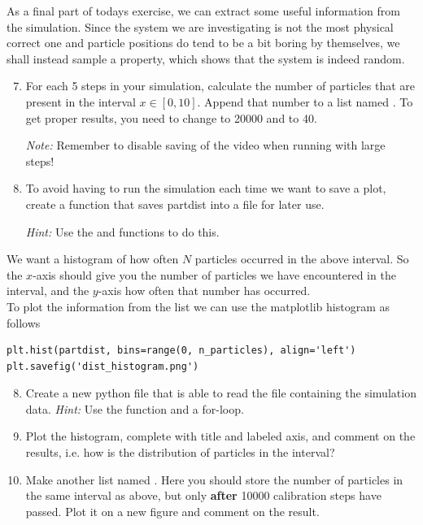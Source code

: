 \documentclass{article}
\begin{document}
As a final part of todays exercise, we can extract some useful information from the simulation.
Since the system we are investigating is not the most physical correct one and particle positions do tend to be a bit boring by themselves, we shall instead sample a property, which shows that the system is indeed random.

\begin{enumerate}
  \setcounter{enumi}{6}
  \item For each 5 steps in your simulation, calculate the number of particles
    that are present in the interval $x \in [0, 10]$.
    Append that number to a list named .
    To get proper results, you need to change  to 20000 and  to 40.

    {\em Note:} Remember to disable saving of the video when running with large steps!

    \item To avoid having to run the simulation each time we want to save a plot, create a function that saves partdist into a file for later use.

    {\em Hint:} Use the  and  functions to do this.

\end{enumerate}


We want a histogram of how often $N$ particles occurred in the above interval.
So the $x$-axis should give you the number of particles we have encountered in the interval, and the $y$-axis how often that number has occurred.\\

To plot the information from the list we can use the matplotlib histogram as follows

\begin{lstlisting}
plt.hist(partdist, bins=range(0, n_particles), align='left')
plt.savefig('dist_histogram.png')
\end{lstlisting}


\begin{enumerate}
  \setcounter{enumi}{7}

  \item Create a new python file that is able to read the file containing the simulation data.
      {\em Hint:} Use the  function and a for-loop.

  \item Plot the histogram, complete with title and labeled axis, and comment on the results, i.e. how is the     distribution of particles in the interval?

  \item Make another list named . Here you should store the number of particles in the same interval as above, but only {\bf after} 10000 calibration steps have passed.
    Plot it on a new figure and comment on the result.

\end{enumerate}
\end{document}
